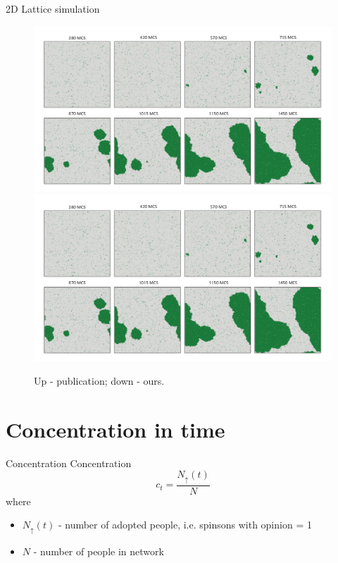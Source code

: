 \documentclass[10pt]{beamer}
\begin{document}
\begin{frame}{2D Lattice simulation}
	\begin{figure}
		\includegraphics[height=0.4\textheight]{../resources/images/fig6.png}
		\hfill
		\includegraphics[height=0.4\textheight]{../resources/images/fig6.png}
		\caption{Up - publication; down - ours.}
	\end{figure}
\end{frame}

\section{Concentration in time}

\begin{frame}{Concentration}
	Concentration
	$$ c_t = \frac{N_{\uparrow}(t)}{N} $$ 
	where 
	\begin{itemize}
		\item $ N_{\uparrow}(t) $ - number of adopted people, i.e. spinsons with opinion = 1
		\item $ N $ - number of people in network
	\end{itemize}

\end{frame}
\end{document}
